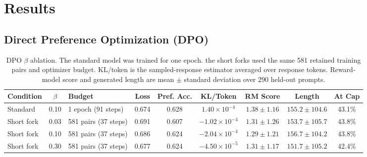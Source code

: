 \documentclass{article}
\begin{document}
\section{Results}

\subsection{Direct Preference Optimization (DPO)}

\begin{table}[t]
    \centering
    \small
    \setlength{\tabcolsep}{4pt}
    \begin{tabular}{l c l c c c c c c}
        \toprule
        Condition & $\beta$ & Budget & Loss & Pref. Acc. &
        KL/Token & RM Score & Length & At Cap \\
        \midrule
        Standard & 0.10 & 1 epoch (91 steps)
        & 0.674 & 0.628 & $1.40{\times}10^{-4}$
        & $1.38 \pm 1.16$ & $155.2 \pm 104.6$ & 43.1\% \\

        Short fork & 0.03 & 581 pairs (37 steps)
        & 0.691 & 0.607 & $-1.02{\times}10^{-4}$
        & $1.31 \pm 1.26$ & $153.7 \pm 105.7$ & 43.8\% \\

        Short fork & 0.10 & 581 pairs (37 steps)
        & 0.686 & 0.624 & $-2.04{\times}10^{-4}$
        & $1.29 \pm 1.21$ & $156.7 \pm 104.2$ & 43.8\% \\

        Short fork & 0.30 & 581 pairs (37 steps)
        & 0.677 & 0.624 & $-4.50{\times}10^{-5}$
        & $1.31 \pm 1.17$ & $151.7 \pm 105.2$ & 42.4\% \\
        \bottomrule
    \end{tabular}
    \caption{DPO $\beta$ ablation. The standard model was trained for
    one epoch. the short forks used the same 581 retained training pairs
    and optimizer budget. KL/token is the sampled-response estimator
    averaged over response tokens. Reward-model score and generated
    length are mean $\pm$ standard deviation over 290 held-out prompts.}
    \label{tab:dpo-beta}
\end{table}
\end{document}
